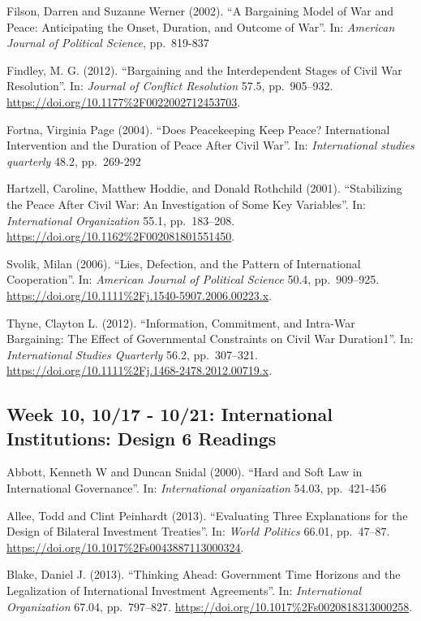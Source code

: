 \documentclass[10pt,]{article}
\begin{document}
Filson, Darren and Suzanne Werner (2002). ``A Bargaining Model of War
and Peace: Anticipating the Onset, Duration, and Outcome of War''. In:
\emph{American Journal of Political Science}, pp.~819-837

Findley, M. G. (2012). ``Bargaining and the Interdependent Stages of
Civil War Resolution''. In: \emph{Journal of Conflict Resolution} 57.5,
pp.~905--932. \url{https://doi.org/10.1177\%2F0022002712453703}.

Fortna, Virginia Page (2004). ``Does Peacekeeping Keep Peace?
International Intervention and the Duration of Peace After Civil War''.
In: \emph{International studies quarterly} 48.2, pp.~269-292

Hartzell, Caroline, Matthew Hoddie, and Donald Rothchild (2001).
``Stabilizing the Peace After Civil War: An Investigation of Some Key
Variables''. In: \emph{International Organization} 55.1, pp.~183--208.
\url{https://doi.org/10.1162\%2F002081801551450}.

Svolik, Milan (2006). ``Lies, Defection, and the Pattern of
International Cooperation''. In:
\emph{American Journal of Political Science} 50.4, pp.~909--925.
\url{https://doi.org/10.1111\%2Fj.1540-5907.2006.00223.x}.

Thyne, Clayton L. (2012). ``Information, Commitment, and Intra-War
Bargaining: The Effect of Governmental Constraints on Civil War
Duration1''. In: \emph{International Studies Quarterly} 56.2,
pp.~307--321. \url{https://doi.org/10.1111\%2Fj.1468-2478.2012.00719.x}.

\subsection{Week 10, 10/17 - 10/21: International Institutions: Design
\textbar{} 6
Readings}\label{week-10-1017---1021-international-institutions-design-6-readings}

Abbott, Kenneth W and Duncan Snidal (2000). ``Hard and Soft Law in
International Governance''. In: \emph{International organization} 54.03,
pp.~421-456

Allee, Todd and Clint Peinhardt (2013). ``Evaluating Three Explanations
for the Design of Bilateral Investment Treaties''. In:
\emph{World Politics} 66.01, pp.~47--87.
\url{https://doi.org/10.1017\%2Fs0043887113000324}.

Blake, Daniel J. (2013). ``Thinking Ahead: Government Time Horizons and
the Legalization of International Investment Agreements''. In:
\emph{International Organization} 67.04, pp.~797--827.
\url{https://doi.org/10.1017\%2Fs0020818313000258}.
\end{document}
